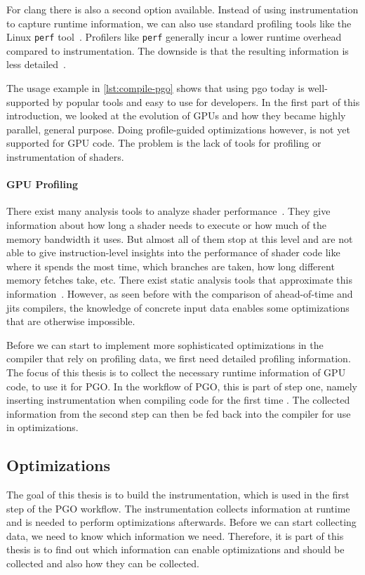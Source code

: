 For clang there is also a second option available. Instead of using instrumentation to capture runtime information, we can also use standard profiling tools like the Linux \texttt{perf} tool~\cite{LinuxPerf}. Profilers like \texttt{perf} generally incur a lower runtime overhead compared to instrumentation. The downside is that the resulting information is less detailed~\cite{ClangManual}.

The usage example in \cref{lst:compile-pgo} shows that using \gls{pgo} today is well-supported by popular tools and easy to use for developers.
In the first part of this introduction, we looked at the evolution of GPUs and how they became highly parallel, general purpose. Doing profile-guided optimizations however, is not yet supported for GPU code. The problem is the lack of tools for profiling or instrumentation of shaders.

\paragraph{GPU Profiling} There exist many analysis tools to analyze shader performance~\cite{RenderDoc, NvidiaShaderPerf}. They give information about how long a shader needs to execute or how much of the memory bandwidth it uses. But almost all of them stop at this level and are not able to give instruction-level insights into the performance of shader code like where it spends the most time, which branches are taken, how long different memory fetches take, etc.
There exist static analysis tools that approximate this information~\cite{AMDShaderAnalyzer}. However, as seen before with the comparison of ahead-of-time and \glspl{jit} compilers, the knowledge of concrete input data enables some optimizations that are otherwise impossible.

Before we can start to implement more sophisticated optimizations in the compiler that rely on profiling data, we first need detailed profiling information. The focus of this thesis is to collect the necessary runtime information of GPU code, to use it for PGO. In the workflow of PGO, this is part of step one, namely inserting instrumentation when compiling code for the first time%
. The collected information from the second step can then be fed back into the compiler for use in optimizations.

\subsection{Optimizations}
The goal of this thesis is to build the instrumentation, which is used in the first step of the PGO workflow. The instrumentation collects information at runtime and is needed to perform optimizations afterwards. Before we can start collecting data, we need to know which information we need. Therefore, it is part of this thesis is to find out which information can enable optimizations and should be collected and also how they can be collected.

